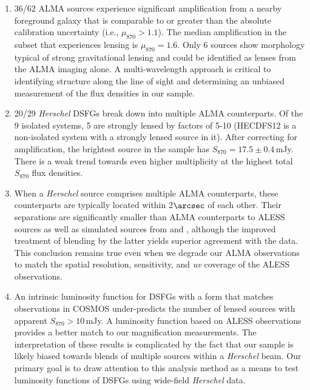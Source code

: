 \documentclass[iop]{emulateapj}
\begin{document}
\begin{enumerate}

    \item 36/62 ALMA sources experience significant amplification from a nearby
        foreground galaxy that is comparable to or greater than the absolute
        calibration uncertainty (i.e., $\mu_{870} > 1.1$).  The median
        amplification in the subset that experiences lensing is $\mu_{870} =
        1.6$.  Only 6 sources show morphology typical of strong gravitational
        lensing and could be identified as lenses from the ALMA imaging alone.
        A multi-wavelength approach is critical to identifying structure along
        the line of sight and determining an unbiased measurement of the flux
        densities in our sample.

    \item 20/29 {\it Herschel} DSFGs break down into multiple ALMA
        counterparts.  Of the 9 isolated systems, 5 are strongly lensed by
        factors of 5-10 (HECDFS12 is a non-isolated system with a strongly
        lensed source in it).  After correcting for amplification, the brightest
        source in the sample has $S_{870} = 17.5 \pm 0.4\,$mJy.  There
        is a weak trend towards even higher multiplicity at the highest total
        $S_{870}$ flux densities.

    \item When a {\it Herschel} source comprises multiple ALMA counterparts,
        these counterparts are typically located within 2$\arcsec$ of each
        other.  Their separations are significantly smaller than ALMA
        counterparts to ALESS sources as well as simulated sources from
        \citet{HB13} and \citet{Cowley:2015lr}, although the improved
        treatment of blending by the latter yields superior agreement with the
        data.  This conclusion remains true even when we degrade our
        ALMA observations to match the spatial resolution, sensitivity, and
        {\it uv} coverage of the ALESS observations.

    \item An intrinsic luminosity function for DSFGs with a form that matches
        observations in COSMOS \citep{Miettinen:2015lr} under-predicts the
        number of lensed sources with apparent $S_{870} > 10\,$mJy.  A
        luminosity function based on ALESS observations provides a better match
        to our magnification measurements.  The interpretation of these results
        is complicated by the fact that our sample is likely biased towards
        blends of multiple sources within a {\it Herschel} beam.  Our primary
        goal is to draw attention to this analysis method as a means to test
        luminosity functions of DSFGs using wide-field {\it Herschel} data. 

\end{enumerate}
\end{document}
